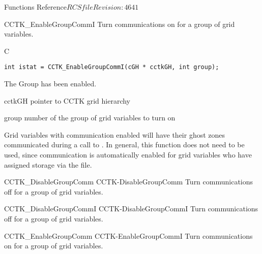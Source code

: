 \begin{cactuspart}{ Functions Reference}{$RCSfile$}{$Revision: 4641 $}
\begin{FunctionDescription}{CCTK\_EnableGroupCommI}
\label{CCTK-EnableGroupCommI}
Turn communications on for a group of grid variables.
\begin{SynopsisSection}
\begin{Synopsis}{C}
\begin{verbatim}
int istat = CCTK_EnableGroupCommI(cGH * cctkGH, int group);
\end{verbatim}
\end{Synopsis}
\end{SynopsisSection}

\begin{ResultSection}
\begin{Result}{0}
The Group has been enabled.
\end{Result}
\end{ResultSection}

\begin{ParameterSection}
\begin{Parameter}{cctkGH}
pointer to CCTK grid hierarchy
\end{Parameter}
\begin{Parameter}{group}
number of the group of grid variables to turn on
\end{Parameter}
\end{ParameterSection}

\begin{Discussion}
Grid variables with communication enabled will have their ghost zones communicated during a call
to . In general, this function does not need to be used, since communication
is automatically enabled for grid variables who have assigned storage via the 
file.
\end{Discussion}

\begin{SeeAlsoSection}
\begin{SeeAlso2} {CCTK\_DisableGroupComm} {CCTK-DisableGroupComm}
Turn communications off for a group of grid variables.
\end{SeeAlso2}
\begin{SeeAlso2} {CCTK\_DisableGroupCommI} {CCTK-DisableGroupCommI}
Turn communications off for a group of grid variables.
\end{SeeAlso2}
\begin{SeeAlso2} {CCTK\_EnableGroupComm} {CCTK-EnableGroupCommI}
Turn communications on for a group of grid variables.
\end{SeeAlso2}
\end{SeeAlsoSection}
\end{FunctionDescription}


\end{cactuspart}
